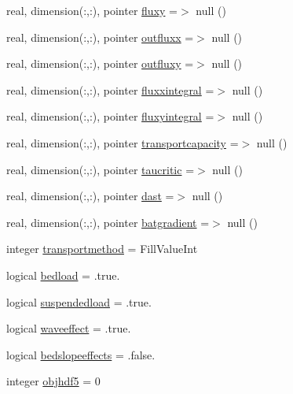 \begin{DoxyCompactItemize}
\item 
real, dimension(\+:,\+:), pointer \mbox{\hyperlink{structmodulesand_1_1t__sand_a9bb1a284701f3b8c5f03ec8c42572111}{fluxy}} =$>$ null ()
\item 
real, dimension(\+:,\+:), pointer \mbox{\hyperlink{structmodulesand_1_1t__sand_ada3bec39b11742b156a671728bb9fd33}{outfluxx}} =$>$ null ()
\item 
real, dimension(\+:,\+:), pointer \mbox{\hyperlink{structmodulesand_1_1t__sand_a6b4e216dbaf5bea54fb6bef4b2059085}{outfluxy}} =$>$ null ()
\item 
real, dimension(\+:,\+:), pointer \mbox{\hyperlink{structmodulesand_1_1t__sand_a853f2b163d04136f60d1ea52480a46c8}{fluxxintegral}} =$>$ null ()
\item 
real, dimension(\+:,\+:), pointer \mbox{\hyperlink{structmodulesand_1_1t__sand_ab6bc3c93069f706188a072690e1d4a84}{fluxyintegral}} =$>$ null ()
\item 
real, dimension(\+:,\+:), pointer \mbox{\hyperlink{structmodulesand_1_1t__sand_a1bfdcc48acd95c0ec784fe5380b0349e}{transportcapacity}} =$>$ null ()
\item 
real, dimension(\+:,\+:), pointer \mbox{\hyperlink{structmodulesand_1_1t__sand_a2f930a12fc5194533dd05c57066a1533}{taucritic}} =$>$ null ()
\item 
real, dimension(\+:,\+:), pointer \mbox{\hyperlink{structmodulesand_1_1t__sand_ad843487ecff7643dc29156804e87dba1}{dast}} =$>$ null ()
\item 
real, dimension(\+:,\+:), pointer \mbox{\hyperlink{structmodulesand_1_1t__sand_ae439c3cf17dd4f64d4b48f8a2a402eec}{batgradient}} =$>$ null ()
\item 
integer \mbox{\hyperlink{structmodulesand_1_1t__sand_ac94d52a6c5668ec21e12ad0eff40b709}{transportmethod}} = Fill\+Value\+Int
\item 
logical \mbox{\hyperlink{structmodulesand_1_1t__sand_a9872f50f49dce2eb1dbdb808be9878c8}{bedload}} = .true.
\item 
logical \mbox{\hyperlink{structmodulesand_1_1t__sand_a2c192a4239c642414a39807a03fb8403}{suspendedload}} = .true.
\item 
logical \mbox{\hyperlink{structmodulesand_1_1t__sand_a19ab30468a6944a1215468ced1ca8167}{waveeffect}} = .true.
\item 
logical \mbox{\hyperlink{structmodulesand_1_1t__sand_aac3845770e3e4f57f06111a022ca9698}{bedslopeeffects}} = .false.
\item 
integer \mbox{\hyperlink{structmodulesand_1_1t__sand_a59fd9a152a04f10fdfed466455f18922}{objhdf5}} = 0

\end{DoxyCompactItemize}
